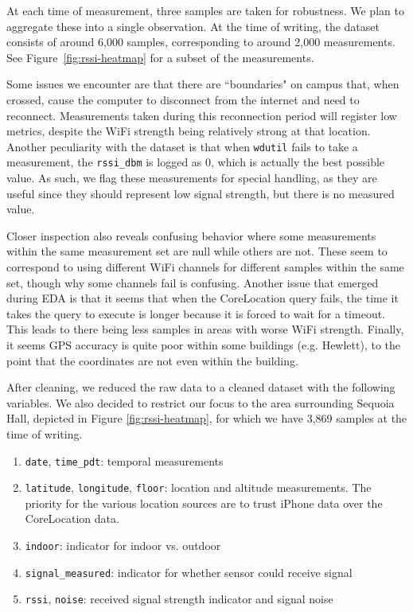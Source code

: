 \documentclass{article}
\begin{document}
At each time of measurement, three samples are taken for robustness. We plan to aggregate these into a single observation. At the time of writing, the dataset consists of around 6,000 samples, corresponding to around 2,000 measurements. See Figure~\ref{fig:rssi-heatmap} for a subset of the measurements. 

Some issues we encounter are that there are ``boundaries" on campus that, when crossed, cause the computer to disconnect from the internet and need to reconnect. Measurements taken during this reconnection period will register low metrics, despite the WiFi strength being relatively strong at that location. Another peculiarity with the dataset is that when \verb|wdutil| fails to take a measurement, the \verb|rssi_dbm| is logged as 0, which is actually the best possible value. As such, we flag these measurements for special handling, as they are useful since they should represent low signal strength, but there is no measured value. 

Closer inspection also reveals confusing behavior where some measurements within the same measurement set are null while others are not. These seem to correspond to using different WiFi channels for different samples within the same set, though why some channels fail is confusing. Another issue that emerged during EDA is that it seems that when the CoreLocation query fails, the time it takes the query to execute is longer because it is forced to wait for a timeout. This leads to there being less samples in areas with worse WiFi strength. Finally, it seems GPS accuracy is quite poor within some buildings (e.g. Hewlett), to the point that the coordinates are not even within the building. 


After cleaning, we reduced the raw data to a cleaned dataset with the following variables. We also decided to restrict our focus to the area surrounding Sequoia Hall, depicted in Figure \ref{fig:rssi-heatmap}, for which we have 3,869 samples at the time of writing.
\begin{enumerate}
    \item \texttt{date}, \texttt{time\_pdt}: temporal measurements
    \item \texttt{latitude}, \texttt{longitude}, \texttt{floor}: location and altitude measurements. The priority for the various location sources are to trust iPhone data over the CoreLocation data. 
    \item \texttt{indoor}: indicator for indoor vs. outdoor
    \item \texttt{signal\_measured}: indicator for whether sensor could receive signal
    \item \texttt{rssi}, \texttt{noise}: received signal strength indicator and signal noise
\end{enumerate}
\end{document}

